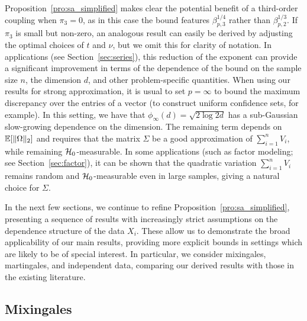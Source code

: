 Proposition~\ref{pro:sa_simplified} makes clear the potential benefit of a
third-order coupling when $\pi_3 = 0$, as in this case the bound features
$\beta_{p,3}^{1/4}$ rather than $\beta_{p,2}^{1/3}$. If $\pi_3$ is small but
non-zero, an analogous result can easily be derived by adjusting the optimal
choices of $t$ and $\nu$, but we omit this for clarity of notation. In
applications (see Section~\ref{sec:series}), this reduction of the exponent can
provide a significant improvement in terms of the dependence of the bound on
the sample size $n$, the dimension $d$, and other problem-specific quantities.
When using our results for strong approximation, it is usual to set
$p = \infty$ to bound the maximum discrepancy over the entries of a vector (to
construct uniform confidence sets, for example). In this setting, we have that
$\phi_\infty(d) = \sqrt{2 \log 2d}$ has a sub-Gaussian slow-growing dependence
on the dimension. The remaining term depends on $\mathbb{E}[\|\Omega\|_2]$ and requires
that the matrix $\Sigma$ be a good approximation of $\sum_{i=1}^{n} V_i$, while
remaining $\mathcal{H}_0$-measurable. In some applications (such as factor modeling;
see Section~\ref{sec:factor}), it can be shown that the quadratic variation
$\sum_{i=1}^n V_i$ remains random and $\mathcal{H}_0$-measurable even in large samples,
giving a natural choice for $\Sigma$.

In the next few sections, we continue to refine
Proposition~\ref{pro:sa_simplified}, presenting a sequence of results with
increasingly strict assumptions on the dependence structure of the data $X_i$.
These allow us to demonstrate the broad applicability of our main results,
providing more explicit bounds in settings which are likely to be of special
interest. In particular, we consider mixingales, martingales, and independent
data, comparing our derived results with those in the existing literature.

\subsection{Mixingales}\label{sec:mixingales}


